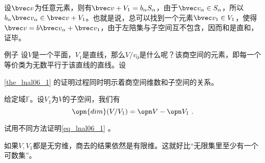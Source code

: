 设$\bvec v$为任意元素，则有$\bvec v+V_1=b_{\alpha} S_{\alpha}$，由于$\bvec v_{\alpha}\in S_{\alpha}$，所以$b_{\alpha} \bvec v_{\alpha}\in\bvec v+V_1$。也就是说，总可以找到一个元素$\bvec v_1\in V_1$，使得$\bvec v=b\bvec v_{\alpha}+\bvec v_1$，由于左陪集与子空间互不包含，因而和是直和，证毕。
\begin{exercise}{例子}
设$V$是一个平面，$V_1$是直线，那么$V/v_0$是什么呢？该商空间的元素，即每一个等价类为无数平行于该直线的直线。设
\end{exercise}
\autoref{the_lnal06_1} 的证明过程同时明示着商空间维数和子空间的关系。
\begin{theorem}{}
给定域$\mathbb F$。设$V_1$为$V$的子空间，我们有
\begin{equation}\label{eq_lnal06_1}
\opn {dim}(V/V_1)=\opn V-\opn V_1~.
\end{equation}
\end{theorem}
\begin{exercise}{}
试用不同方法证明\autoref{eq_lnal06_1} 。
\end{exercise}
如果$V,V_1$都是无穷维，商去的结果依然是有限维。这就好比“无限集里至少有一个可数集”。